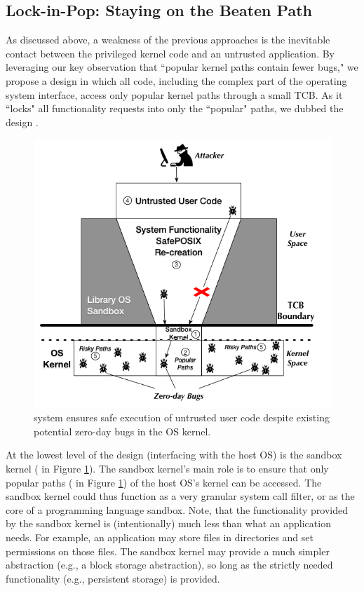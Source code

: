 \subsection{Lock-in-Pop: Staying on the Beaten Path }
As discussed above, a weakness of the previous approaches is the inevitable contact
between the privileged kernel code and an untrusted application.
By leveraging our key observation
that ``popular kernel paths contain fewer bugs," we propose a design
in which all code, including the complex part
of the operating system interface, access only
popular kernel paths through a small TCB. As it ``locks" all functionality
requests into only the ``popular" paths, we dubbed the
design \lip.

\begin{figure}%
\centering
\includegraphics[width=1.0\columnwidth]{diagram/Virtualization_Design_Model_01.png}
\caption{\small \lip system ensures safe execution of untrusted user code
despite existing potential zero-day bugs in the OS kernel.}
\label{fig:design_safe_reimplementation}
\end{figure}

At the lowest level of the design (interfacing with the host OS) is the 
sandbox kernel ( in Figure \ref{fig:design_safe_reimplementation}). 
The sandbox kernel's main role is to ensure that only popular paths ( in Figure \ref{fig:design_safe_reimplementation}) 
of the host OS's kernel can be accessed. 
The sandbox kernel could thus function as a very granular system call filter, or 
as the core of a programming language sandbox. Note, that the functionality
provided by the sandbox kernel is (intentionally) much less than what 
an application needs. For example, an application may store files in directories and set permissions on those files. 
The sandbox kernel may provide a much simpler abstraction (e.g., a block storage abstraction), 
so long as the strictly needed functionality (e.g., persistent storage) is provided.

